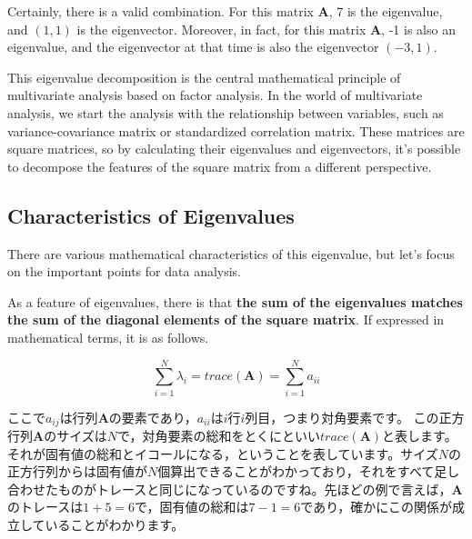 \documentclass{ltjsbook}
\begin{document}
Certainly, there is a valid combination. For this matrix $\bm{A}$, 7 is the eigenvalue, and $(1,1)$ is the eigenvector.
Moreover, in fact, for this matrix $ \bm {A} $, -1 is also an eigenvalue, and the eigenvector at that time is also the eigenvector $(-3,1)$.

This eigenvalue decomposition is the central mathematical principle of multivariate analysis based on factor analysis. In the world of multivariate analysis, we start the analysis with the relationship between variables, such as variance-covariance matrix or standardized correlation matrix. These matrices are square matrices, so by calculating their eigenvalues and eigenvectors, it's possible to decompose the features of the square matrix from a different perspective.

\subsection{Characteristics of Eigenvalues}
There are various mathematical characteristics of this eigenvalue, but let's focus on the important points for data analysis.

As a feature of eigenvalues, there is that \textbf{the sum of the eigenvalues matches the sum of the diagonal elements of the square matrix}. If expressed in mathematical terms, it is as follows.

\[ \sum_{i=1}^N \lambda_i = trace(\bm{A}) = \sum_{i=1}^N a_{ii} \]

ここで$a_{ij}$は行列$\bm{A}$の要素であり，$a_{ii}$は$i$行$i$列目，つまり対角要素です。
この正方行列$\bm{A}$のサイズは$N$で，対角要素の総和をとくにといい$trace(\bm{A})$と表します。
それが固有値の総和とイコールになる，ということを表しています。サイズ$N$の正方行列からは固有値が$N$個算出できることがわかっており，それをすべて足し合わせたものがトレースと同じになっているのですね。先ほどの例で言えば，$\bm{A}$のトレースは$1+5=6$で，固有値の総和は$7-1=6$であり，確かにこの関係が成立していることがわかります。
\end{document}
